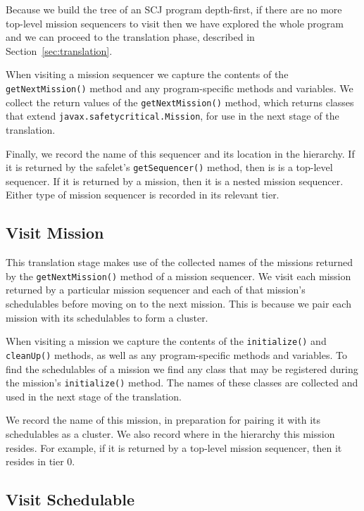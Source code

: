 \documentclass[10pt,a4paper]{article}
\begin{document}
Because we build the tree of an SCJ program depth-first, if there are no more top-level mission sequencers to visit then we have explored the whole program and we can proceed to the translation phase, described in Section~\ref{sec:translation}.

When visiting a mission sequencer we capture the contents of the \texttt{getNextMission()} method and any program-specific methods and variables. We collect the return values of the \texttt{getNextMission()} method, which returns classes that extend \texttt{javax.safetycritical.Mission}, for use in the next stage of the translation. 

Finally, we record the name of this sequencer and its location in the hierarchy. If it is returned by the safelet's \texttt{getSequencer()} method, then is is a top-level sequencer. If it is returned by a mission, then it is a nested mission sequencer. Either type of mission sequencer is recorded in its relevant tier.

\subsection{Visit Mission}
\label{sec:mission}

This translation stage makes use of the collected names of the missions returned by the \texttt{getNextMission()} method of a mission sequencer. We visit each mission returned by a particular mission sequencer and each of that mission's schedulables before moving on to the next mission. This is because we pair each mission with its schedulables to form a cluster. 

When visiting a mission we capture the contents of the \texttt{initialize()} and \texttt{cleanUp()} methods, as well as any program-specific methods and variables. To find the schedulables of a mission we find any class that may be registered during the mission's \texttt{initialize()} method. The names of these classes are collected and used in the next stage of the translation. 

We record the name of this mission, in preparation for pairing it with its schedulables as a cluster. We also record where in the hierarchy this mission resides. For example, if it is returned by a top-level mission sequencer, then it resides in tier 0. 

\subsection{Visit Schedulable}
\label{sec:schedulables}
\end{document}
